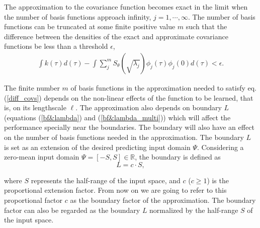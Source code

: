 \documentclass[]{interact}
\theoremstyle{plain}%
\theoremstyle{definition}
\theoremstyle{remark}
\begin{document}
The approximation to the covariance function becomes exact in the limit when the number of basis functions approach infinity, $j=1,\cdots,\infty$. The number of basis functions can be truncated at some finite positive value $m$ such that the difference between the densities of the exact and approximate covariance functions be less than a threshold $\epsilon$,
%
\begin{eqnarray}\label{diff_covs}
\int k(\tau)d(\tau) - \int \sum_{j}^m S_{\theta}(\sqrt{\lambda_j}) \phi_j(\tau) \phi_j(0) d(\tau) < \epsilon.
\end{eqnarray}

The finite number $m$ of basis functions in the approximation needed to satisfy eq. (\ref{diff_covs}) depends on the non-linear effects of the function to be learned, that is, on its lengthscale $\ell$. The approximation also depends on boundary $L$ (equations (\ref{bf&lambda}) and (\ref{bf&lambda_multi})) which will affect the performance specially near the boundaries. The boundary will also have an effect on the number of basis functions needed in the approximation. The boundary $L$ is set as an extension of the desired predicting input domain $\Psi$. Considering a zero-mean input domain $\Psi=[-S,S] \in \mathbb{R}$, the boundary is defined as
%
\begin{equation}
L=c \cdot S,
\end{equation} 

\noindent where $S$ represents the half-range of the input space, and $c$ ($c \ge 1$) is the proportional extension factor. From now on we are going to refer to this proportional factor $c$ as the boundary factor of the approximation. The boundary factor can also be regarded as the boundary $L$ normalized by the half-range $S$ of the input space.
\end{document}
